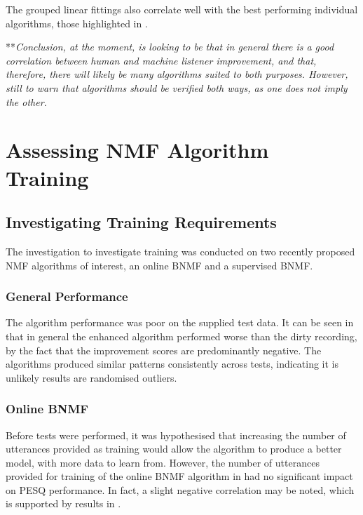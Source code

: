 The grouped linear fittings also correlate well with the best performing
individual algorithms, those highlighted in .

{*}{*}\textit{Conclusion, at the moment, is looking to be that in
general there is a good correlation between human and machine listener
improvement, and that, therefore, there will likely be many algorithms
suited to both purposes. However, still to warn that algorithms should
be verified both ways, as one does not imply the other.}


\section{Assessing \acl{NMF} Algorithm Training}


\subsection{Investigating Training Requirements}

The investigation to investigate training was conducted on two recently
proposed \ac{NMF} algorithms of interest, an online \ac{BNMF} and
a supervised \ac{BNMF}.


\subsubsection*{General Performance}

The algorithm performance was poor on the supplied test data. It can
be seen in  that in general the enhanced
algorithm performed worse than the dirty recording, by the fact that
the improvement scores are predominantly negative. The algorithms
produced similar patterns consistently across tests, indicating it
is unlikely results are randomised outliers.


\subsubsection*{Online \acl{BNMF}}

Before tests were performed, it was hypothesised that increasing the
number of utterances provided as training would allow the algorithm
to produce a better model, with more data to learn from. However,
the number of utterances provided for training of the online \ac{BNMF}
algorithm in  had no significant impact on
\ac{PESQ} performance. In fact, a slight negative correlation may
be noted, which is supported by results in .
